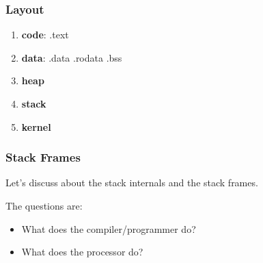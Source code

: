 
\begin{frame}
  \frametitle{Layout}

  \begin{enumerate}
    \item
      \textbf{code}: .text
    \item
      \textbf{data}: .data .rodata .bss
    \item
      \textbf{heap}
    \item
      \textbf{stack}
    \item
      \textbf{kernel}
  \end{enumerate}
\end{frame}


\begin{frame}
  \frametitle{Stack Frames}

  Let's discuss about the stack internals and the stack frames.

  \nl

  The questions are:

  \begin{itemize}
    \item
      What does the compiler/programmer do?
    \item
      What does the processor do?
  \end{itemize}
\end{frame}


